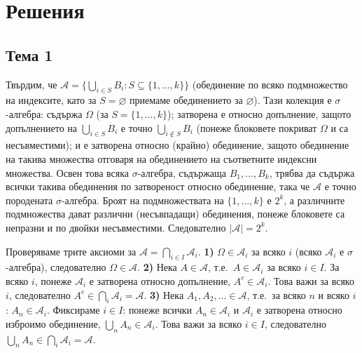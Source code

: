 \chapter*{Решения}

\section*{Тема 1}

\begin{proofbox}
Твърдим, че $\mathcal A = \big\{\bigcup_{i\in S} B_i : S\subseteq
\{1,\dots,k\}\big\}$ (обединение по всяко подмножество на индексите,
като за $S=\varnothing$ приемаме обединението за $\varnothing$).
Тази колекция е $\sigma$-алгебра: съдържа $\Omega$ (за $S=\{1,\dots,
k\}$); затворена е относно допълнение, защото допълнението на
$\bigcup_{i\in S}B_i$ е точно $\bigcup_{i\notin S}B_i$ (понеже
блоковете покриват $\Omega$ и са несъвместими); и е затворена относно
(крайно) обединение, защото обединение на такива множества отговаря
на обединението на съответните индексни множества. Освен това всяка
$\sigma$-алгебра, съдържаща $B_1,\dots,B_k$, трябва да съдържа всички
такива обединения по затвореност относно обединение, така че
$\mathcal A$ е точно породената $\sigma$-алгебра. Броят на
подмножествата на $\{1,\dots,k\}$ е $2^k$, а различните подмножества
дават различни (несъвпадащи) обединения, понеже блоковете са
непразни и по двойки несъвместими. Следователно $|\mathcal A|=2^k$.
\end{proofbox}

\begin{proofbox}
Проверяваме трите аксиоми за $\mathcal A=\bigcap_{i\in I}\mathcal
A_i$. \textbf{1)} $\Omega\in\mathcal A_i$ за всяко $i$ (всяко
$\mathcal A_i$ е $\sigma$-алгебра), следователно $\Omega\in\mathcal
A$. \textbf{2)} Нека $A\in\mathcal A$, т.е.\ $A\in\mathcal A_i$ за
всяко $i\in I$. За всяко $i$, понеже $\mathcal A_i$ е затворена
относно допълнение, $A^c\in\mathcal A_i$. Това важи за всяко $i$,
следователно $A^c\in\bigcap_i\mathcal A_i=\mathcal A$. \textbf{3)}
Нека $A_1,A_2,\dots\in\mathcal A$, т.е.\ за всяко $n$ и всяко $i$:
$A_n\in\mathcal A_i$. Фиксираме $i\in I$: понеже всички $A_n\in
\mathcal A_i$ и $\mathcal A_i$ е затворена относно изброимо
обединение, $\bigcup_n A_n\in\mathcal A_i$. Това важи за всяко
$i\in I$, следователно $\bigcup_n A_n\in\bigcap_i\mathcal A_i=
\mathcal A$. \qedbg
\end{proofbox}

